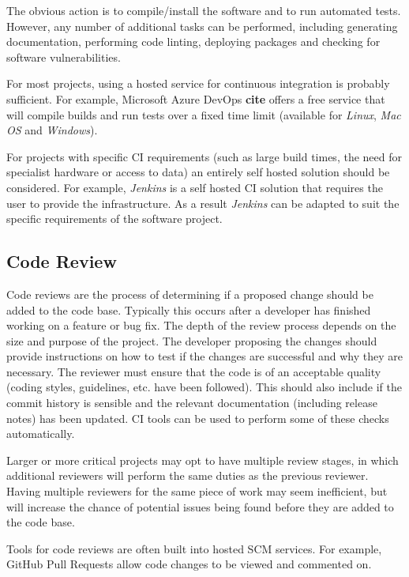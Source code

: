 \documentclass[jnr]{iosart2x}
\newcommand{\todo}[1]{\textbf{#1}}
\begin{document}
The obvious action is to compile/install the software and to run automated tests.
However, any number of additional tasks can be performed, including generating documentation, performing code linting, deploying packages and checking for software vulnerabilities.

For most projects, using a hosted service for continuous integration is probably sufficient.
For example, Microsoft Azure DevOps \todo{cite} offers a free service that will compile builds and run tests over a fixed time limit (available for {\it Linux}, {\it Mac OS} and {\it Windows}).

For projects with specific CI requirements (such as large build times, the need for specialist hardware or access to data) an entirely self hosted solution should be considered.
For example, {\it Jenkins} \cite{Jenkins} is a self hosted CI solution that requires the user to provide the infrastructure.
As a result {\it Jenkins} can be adapted to suit the specific requirements of the software project.

\subsection{Code Review}
\label{Code review}

Code reviews are the process of determining if a proposed change should be added to the code base.
Typically this occurs after a developer has finished working on a feature or bug fix.
The depth of the review process depends on the size and purpose of the project.
The developer proposing the changes should provide instructions on how to test if the changes are successful and why they are necessary.
The reviewer must ensure that the code is of an acceptable quality (coding styles, guidelines, etc. have been followed).
This should also include if the commit history is sensible and the relevant documentation (including release notes) has been updated.
CI tools can be used to perform some of these checks automatically.

Larger or more critical projects may opt to have multiple review stages, in which additional reviewers will perform the same duties as the previous reviewer.
Having multiple reviewers for the same piece of work may seem inefficient, but will increase the chance of potential issues being found before they are added to the code base.

Tools for code reviews are often built into hosted SCM services.
For example, GitHub Pull Requests allow code changes to be viewed and commented on.
\end{document}
